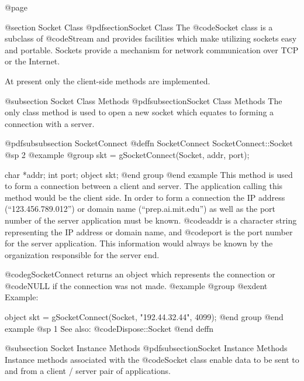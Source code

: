 @page

@section Socket Class
@pdfsection{Socket Class}
The @code{Socket} class is a subclass of @code{Stream} and provides
facilities which make utilizing sockets easy and portable.  Sockets
provide a mechanism for network communication over TCP or the Internet.


At present only the client-side methods are implemented.


@subsection Socket Class Methods
@pdfsubsection{Socket Class Methods}
The only class method is used to open a new socket which equates to
forming a connection with a server.














@pdfsubsubsection {SocketConnect}
@deffn {SocketConnect} SocketConnect::Socket
@sp 2
@example
@group
skt = gSocketConnect(Socket, addr, port);

char    *addr;
int     port;
object  skt;
@end group
@end example
This method is used to form a connection between a client and server.
The application calling this method would be the client side.  In order
to form a connection the IP address (``123.456.789.012'') or domain name
(``prep.ai.mit.edu'') as well as the port number of the server
application must be known.  @code{addr} is a character string representing
the IP address or domain name, and @code{port} is the port number for the
server application.  This information would always be known by the organization
responsible for the server end.

@code{gSocketConnect} returns an object which represents the connection or
@code{NULL} if the connection was not made.
@example
@group
@exdent Example:

object  skt = gSocketConnect(Socket, "192.44.32.44", 4099);
@end group
@end example
@sp 1
See also:  @code{Dispose::Socket}
@end deffn










@subsection Socket Instance Methods
@pdfsubsection{Socket Instance Methods}
Instance methods associated with the @code{Socket} class enable data to
be sent to and from a client / server pair of applications.
















